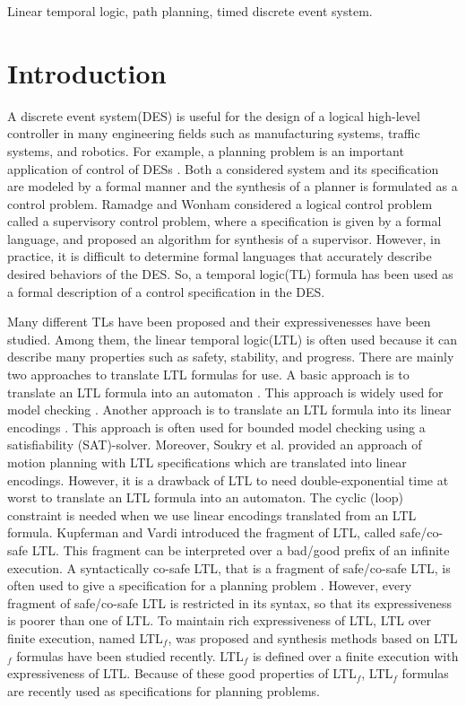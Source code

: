 \documentclass{article}
\begin{document}
\begin{IEEEkeywords}
Linear temporal logic, path planning, timed discrete event system.
\end{IEEEkeywords}
%
\section{Introduction}
%
%
%
A discrete event system(DES) is useful for the design of a logical high-level controller in many engineering fields such as manufacturing systems, traffic systems, and robotics\cite{CL2008,CSX2018,SSS2013}.
%
For example, a planning problem is an important application of control of DESs \cite{ghallab2016automated}.  Both a considered system and its specification are modeled by a formal manner and the synthesis of a planner is formulated as a control problem.  
Ramadge and Wonham \cite{ramadge1987supervisory} considered a logical control problem called a supervisory control problem, where a specification is given by a formal language, and proposed an algorithm for synthesis of a supervisor.
%
%
However, in practice, it is difficult to determine formal languages that accurately describe desired behaviors of the DES.
So, a temporal logic(TL) formula has been used as a formal description of a control specification in the DES\cite{TW1986,JK2006,SU2018}.

%
Many different TLs have been proposed and their expressivenesses have been studied. 
Among them, the linear temporal logic(LTL) is often used because it can describe many properties such as safety, stability, and progress.
There are mainly two approaches to translate LTL formulas for use.
A basic approach is to translate an LTL formula into an automaton \cite{GV1999}. This approach is widely used for model checking \cite{BK2008}.
Another approach is to translate an LTL formula into its linear encodings \cite{BHJLS2006}. This approach is often used for bounded model checking using a satisfiability (SAT)-solver. 
Moreover, Soukry et al.\cite{S2016} provided an approach of motion planning with LTL specifications which are translated into linear encodings.
%
However, it is a drawback of LTL to need double-exponential time at worst to translate an LTL formula into an automaton.
The cyclic (loop) constraint is needed when we use linear encodings translated from an LTL formula\cite{sahin2019multirobot}. 
Kupferman and Vardi \cite{kupferman2001model} introduced the fragment of LTL, called safe/co-safe LTL. 
This fragment can be interpreted over a bad/good prefix of an infinite execution.
A syntactically co-safe LTL, that is a fragment of safe/co-safe LTL, is often used to give a specification for a planning problem \cite{cho2017cost,feyzabadi2016multi}.
%
However, every fragment of safe/co-safe LTL is restricted in its syntax, so that its expressiveness is poorer than one of LTL.  
To maintain rich expressiveness of LTL, LTL over finite execution, named LTL$_f$, was proposed and synthesis methods based on LTL$_f$ formulas have been studied recently\cite{Zhu2017,li2019sat}.
LTL$_f$ is defined over a finite execution with expressiveness of LTL.
Because of these good properties of LTL$_f$, LTL$_f$ formulas are recently used as specifications for planning problems\cite{camacho2019strong}.
\end{document}
